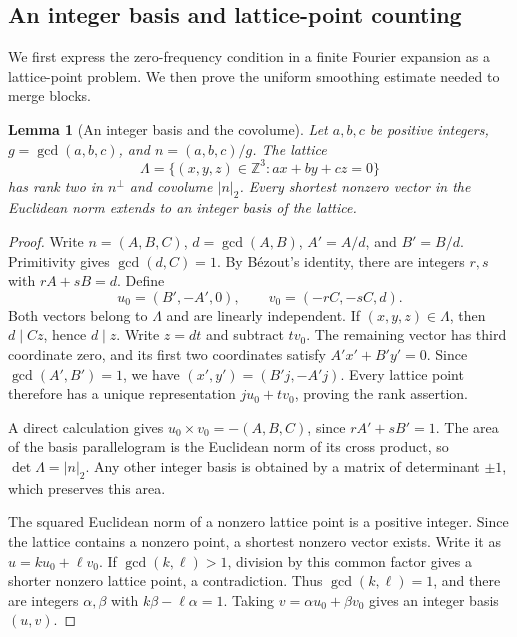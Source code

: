 \documentclass[12pt,leqno]{article}
\numberwithin{equation}{section}
\newtheorem{lemma}[theorem]{Lemma}
\theoremstyle{remark}
\newcommand{\LRinteger}{\mathbb Z}
\begin{document}
\subsection{An integer basis and lattice-point counting}
We first express the zero-frequency condition in a finite Fourier expansion as a lattice-point problem. We then prove the uniform smoothing estimate needed to merge blocks.
\begin{lemma}[An integer basis and the covolume]\label{lem:latticebasis}
Let $a,b,c$ be positive integers, $g=\gcd(a,b,c)$, and $n=(a,b,c)/g$. The lattice
\[
\Lambda=\{(x,y,z)\in\LRinteger^3:ax+by+cz=0\}
\]
has rank two in $n^\perp$ and covolume $|n|_2$. Every shortest nonzero vector in the Euclidean norm extends to an integer basis of the lattice.
\end{lemma}
\begin{proof}
Write $n=(A,B,C)$, $d=\gcd(A,B)$, $A'=A/d$, and $B'=B/d$. Primitivity gives $\gcd(d,C)=1$. By B\'ezout's identity, there are integers $r,s$ with $rA+sB=d$. Define
\[
u_0=(B',-A',0),\qquad v_0=(-rC,-sC,d).
\]
Both vectors belong to $\Lambda$ and are linearly independent. If $(x,y,z)\in\Lambda$, then $d\mid Cz$, hence $d\mid z$. Write $z=dt$ and subtract $t v_0$. The remaining vector has third coordinate zero, and its first two coordinates satisfy $A'x'+B'y'=0$. Since $\gcd(A',B')=1$, we have $(x',y')=(B'j,-A'j)$. Every lattice point therefore has a unique representation $j u_0+t v_0$, proving the rank assertion.

A direct calculation gives $u_0\times v_0=-(A,B,C)$, since $rA'+sB'=1$. The area of the basis parallelogram is the Euclidean norm of its cross product, so $\det\Lambda=|n|_2$. Any other integer basis is obtained by a matrix of determinant $\pm1$, which preserves this area.

The squared Euclidean norm of a nonzero lattice point is a positive integer. Since the lattice contains a nonzero point, a shortest nonzero vector exists. Write it as $u=k u_0+\ell v_0$. If $\gcd(k,\ell)>1$, division by this common factor gives a shorter nonzero lattice point, a contradiction. Thus $\gcd(k,\ell)=1$, and there are integers $\alpha,\beta$ with $k\beta-\ell\alpha=1$. Taking $v=\alpha u_0+\beta v_0$ gives an integer basis $(u,v)$.
\end{proof}
\end{document}
